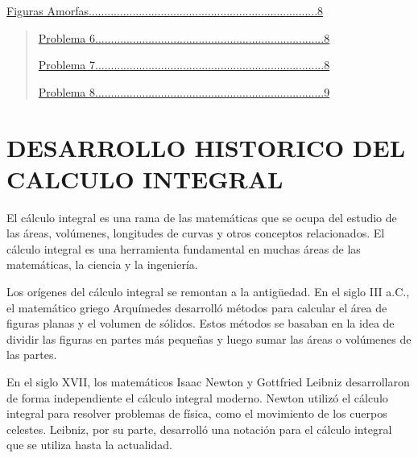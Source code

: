 \documentclass[12pt]{article}
\begin{document}
\fontsize{16}{50}\selectfont
\hyperref[sec:fig_amorfas]{Figuras Amorfas.........................................................................8}

\begin{quote}
  \raggedleft

  \fontsize{16}{30}\selectfont
  \hyperref[fig_amorfas:problema_1]{Problema 6.........................................................................8}

  \fontsize{16}{30}\selectfont
  \hyperref[fig_amorfas:problema_2]{Problema 7.........................................................................8}

  \fontsize{16}{30}\selectfont
  \hyperref[fig_amorfas:problema_3]{Problema 8.........................................................................9}
\end{quote}


\newpage


\centering
\section*{\fontsize{14}{30}\selectfont DESARROLLO HISTORICO DEL CALCULO INTEGRAL} \label{rehearsal-title-y}



\fontsize{14}{15}\selectfont
\raggedright 
El cálculo integral es una rama de las matemáticas que se ocupa del estudio de las áreas, volúmenes, longitudes de curvas y otros conceptos relacionados. El cálculo integral es una herramienta fundamental en muchas áreas de las matemáticas, la ciencia y la ingeniería.  \newline

Los orígenes del cálculo integral se remontan a la antigüedad. En el siglo III a.C., el matemático griego Arquímedes desarrolló métodos para calcular el área de figuras planas y el volumen de sólidos. Estos métodos se basaban en la idea de dividir las figuras en partes más pequeñas y luego sumar las áreas o volúmenes de las partes. \newline

En el siglo XVII, los matemáticos Isaac Newton y Gottfried Leibniz desarrollaron de forma independiente el cálculo integral moderno. Newton utilizó el cálculo integral para resolver problemas de física, como el movimiento de los cuerpos celestes. Leibniz, por su parte, desarrolló una notación para el cálculo integral que se utiliza hasta la actualidad. \newline
\end{document}

